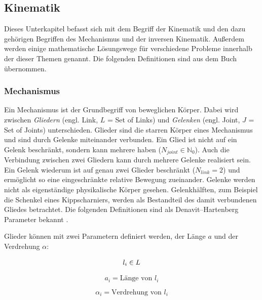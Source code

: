 \subsection{Kinematik }
\label{sec:basics-ik}
    
Dieses Unterkapitel befasst sich mit dem Begriff der Kinematik und den dazu gehörigen Begriffen des Mechanismus und der inversen Kinematik. Außerdem werden einige mathematische Lösungswege für verschiedene Probleme innerhalb der dieser Themen genannt. Die folgenden Definitionen sind aus dem Buch \cite[Kapitel 7]{Corke2011} übernommen.

\subsubsection{Mechanismus}

Ein Mechanismus ist der Grundbegriff von beweglichen Körper. Dabei wird zwischen \textit{Gliedern} (engl. Link, $L$ = Set of Links) und \textit{Gelenken} (engl. Joint, $J$ = Set of Joints) unterschieden. Glieder sind die starren Körper eines Mechanismus und sind durch Gelenke miteinander verbunden. Ein Glied ist nicht auf ein Gelenk beschränkt, sondern kann mehrere haben ($N_{joint} \in \mathds{N}_0$). Auch die Verbindung zwischen zwei Gliedern kann durch mehrere  Gelenke realisiert sein. Ein Gelenk wiederum ist auf genau zwei Glieder beschränkt  ($N_{link} = 2$) und ermöglicht so eine eingeschränkte relative Bewegung zueinander. Gelenke werden nicht als eigenständige physikalische Körper gesehen. Gelenkhälften, zum Beispiel die Schenkel eines Kippscharniers, werden als Bestandteil des damit verbundenen Gliedes betrachtet. Die folgenden Definitionen sind als Denavit–Hartenberg Parameter bekannt \citep{Corke2011}.

Glieder können mit zwei Parametern definiert werden, der Länge $a$ und der Verdrehung $\alpha$:

\begin{displaymath}
	l_i \in L \\
\end{displaymath}

\begin{equation}
a_i =  \text{Länge von } l_i
\end{equation}

\begin{equation}
\alpha_i =  \text{Verdrehung von } l_i 
\end{equation}

